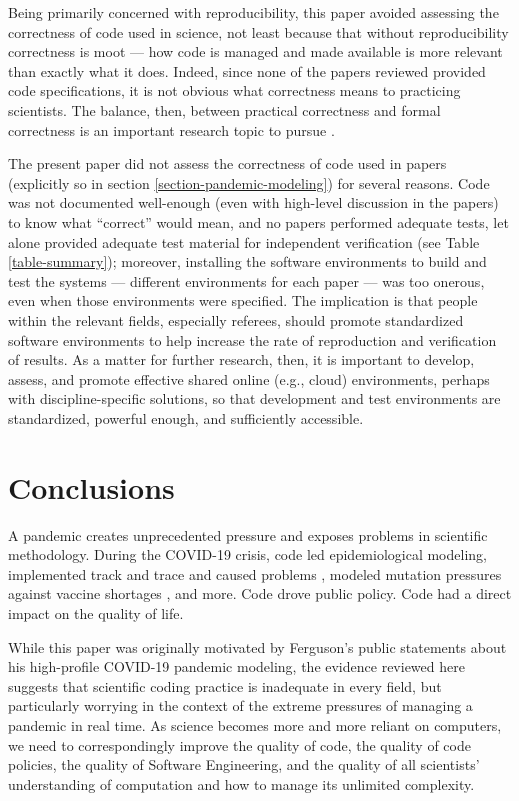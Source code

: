 \documentclass{comjnl}
\begin{document}
Being primarily concerned with reproducibility, this paper avoided assessing the correctness of code used in science, not least because that without reproducibility correctness is moot --- how code is managed and made available is more relevant than exactly what it does. Indeed, since none of the papers reviewed provided code specifications, it is not obvious what correctness means to practicing scientists. The balance, then, between practical correctness and formal correctness is an important research topic to pursue \cite{hoare-unreasonable}.

The present paper did not assess the correctness of code used in papers (explicitly so in section \ref{section-pandemic-modeling}) for several reasons. Code was not documented well-enough (even with high-level discussion in the papers) to know what ``correct'' would mean, and no papers performed adequate tests, let alone provided adequate test material for independent verification (see Table \ref{table-summary}); moreover, installing the software environments to build and test the systems --- different environments for each paper --- was too onerous, even when those environments were specified. The implication is that people within the relevant fields, especially referees, should promote standardized software environments to help increase the rate of reproduction and verification of results. As a matter for further research, then, it is important to develop, assess, and promote effective shared online (e.g., cloud) environments, perhaps with discipline-specific solutions, so that development and test environments are standardized, powerful enough, and sufficiently accessible.

\section{Conclusions}
A pandemic creates unprecedented pressure and exposes problems in scientific methodology. During the COVID-19 crisis, code led epidemiological modeling, implemented track and trace and caused problems \cite{excel-fiasco}, modeled mutation pressures against vaccine shortages \cite{science-delays}, and more. Code drove public policy. Code had a direct impact on the quality of life. 

While this paper was originally motivated by Ferguson's public statements  about his high-profile COVID-19 pandemic modeling, the evidence reviewed here suggests that scientific coding practice is inadequate in every field, but particularly worrying in the context of the extreme pressures of managing a pandemic in real time. As science becomes more and more reliant on computers, we need to correspondingly improve the quality of code, the quality of code policies, the quality of Software Engineering, and the quality of all scientists' understanding of computation and how to manage its unlimited complexity. 
\end{document}
